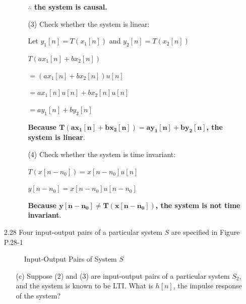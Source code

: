 \documentclass[fleqn]{article}
\begin{document}
\begin{enumerate}[nolistsep]
\begin{enumerate}[nolistsep]
\begin{enumerate}[nolistsep]
					\textbf{$\mathbf{\therefore}$ the system is causal.}
					
					\item[(3)] Check whether the system is linear:
					
					Let $y_1[n] = T(x_1[n])$ and $y_2[n] = T(x_2[n])$
					
					$T(ax_1[n] + bx_2[n])$
					
					$ = (ax_1[n] + bx_2[n])u[n]$
					
					$ = ax_1[n]u[n] + bx_2[n]u[n]$
					
					$ = ay_1[n] + by_2[n]$
					
					\textbf{Because $\mathbf{T(ax_1[n] + bx_2[n]) = ay_1[n] + by_2[n]}$, the system is linear}.
					
					\item[(4)] Check whether the system is time invariant:
					
					$T(x[n-n_0]) = x[n-n_0]u[n]$
					
					$y[n-n_0] = x[n-n_0]u[n-n_0]$
					
					\textbf{Because $\mathbf{y[n-n_0] \neq T(x[n-n_0])}$, the system is not time invariant}.
				\end{enumerate}			
		\end{enumerate}
		
		\item[2.28] Four input-output pairs of a particular system $S$ are specified in Figure P.28-1
		
			\begin{figure}[H]
			\centerline{}
			\caption{Input-Output Pairs of System $S$}
			\label{prob_statement_2_28}
			\end{figure}
		
			\begin{enumerate}
				\item[(c)] Suppose (2) and (3) are input-output pairs of a particular system $S_2$, and the system is known to be LTI. What is $h[n]$, the impulse response of the system?
				

\end{enumerate}
\end{enumerate}
\end{document}
